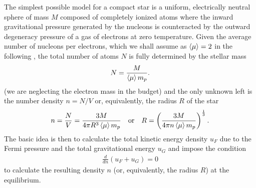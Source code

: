 The simplest possible model for a compact star is a uniform, electrically
neutral sphere of mass $M$ composed of completely ionized atoms where the inward
gravitational pressure generated by the nucleons is counteracted by the outward
degeneracy pressure of a gas of electrons at zero temperature.
Given the average number of nucleons per electrons, which we shall assume as
$\left<\mu\right> = 2$ in the following%
,
the total number of atoms $N$ is fully determined by the stellar mass
\begin{align}
  N = \frac{M}{\left<\mu\right> m_p}.
\end{align}
(we are neglecting the electron mass in the budget) and the only unknown left is
the number density $n = N/V$ or, equivalently, the radius $R$ of the star
\begin{align}\label{eq:wd_radius_density}
  n = \frac{N}{V} = \frac{3M}{4\pi R^3 \left<\mu\right> m_p} \quad\text{or}\quad
  R = \left( \frac{3M}{4\pi n \left<\mu\right> m_p} \right)^{\frac{1}{3}}.
\end{align}
The basic idea is then to calculate the total kinetic energy density $u_F$ due to the
Fermi pressure and the total gravitational energy $u_G$
and impose the condition
\begin{align}\label{eq:wd_equilibrium_condition}
  \frac{d}{dn} (u_F + u_G) = 0
\end{align}
to calculate the resulting density $n$ (or, equivalently, the radius $R$) at the
equilibrium.

\begin{marginfigure}
  
  \caption{Calculation of the gravitational binding energy of a uniform sphere
    with constant density $\rho$.}
  \label{fig:sphere_gravitational_energy}
\end{marginfigure}

